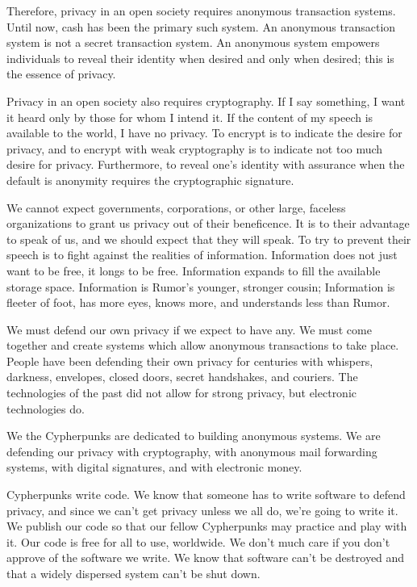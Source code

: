 \documentclass[statementpaper,oneside,article,14pt]{memoir}
\begin{document}
\newpage

 Therefore, privacy in an open society requires anonymous transaction systems. Until now, cash has been the primary such system. An anonymous transaction system is not a secret transaction system. An anonymous system empowers individuals to reveal their identity when desired and only when desired; this is the essence of privacy.
 
Privacy in an open society also requires cryptography. If I say something, I want it heard only by those for whom I intend it. If the content of my speech is available to the world, I have no privacy. To encrypt is to indicate the desire for privacy, and to encrypt with weak cryptography is to indicate not too much desire for privacy. Furthermore, to reveal one's identity with assurance when the default is anonymity requires the cryptographic signature.

\newpage

We cannot expect governments, corporations, or other large, faceless organizations to grant us privacy out of their beneficence. It is to their advantage to speak of us, and we should expect that they will speak. To try to prevent their speech is to fight against the realities of information. Information does not just want to be free, it longs to be free. Information expands to fill the available storage space. Information is Rumor's younger, stronger cousin; Information is fleeter of foot, has more eyes, knows more, and understands less than Rumor. 

We must defend our own privacy if we expect to have any. We must come together and create systems which allow anonymous transactions to take place. People have been defending their own privacy for centuries with whispers, darkness, envelopes, closed doors, secret handshakes, and couriers. The technologies of the past did not allow for strong privacy, but electronic technologies do.

\newpage

We the Cypherpunks are dedicated to building anonymous systems. We are defending our privacy with cryptography, with anonymous mail forwarding systems, with digital signatures, and with electronic money.

Cypherpunks write code. We know that someone has to write software to defend privacy, and since we can't get privacy unless we all do, we're going to write it. We publish our code so that our fellow Cypherpunks may practice and play with it. Our code is free for all to use, worldwide. We don't much care if you don't approve of the software we write. We know that software can't be destroyed and that a widely dispersed system can't be shut down. 
\end{document}
